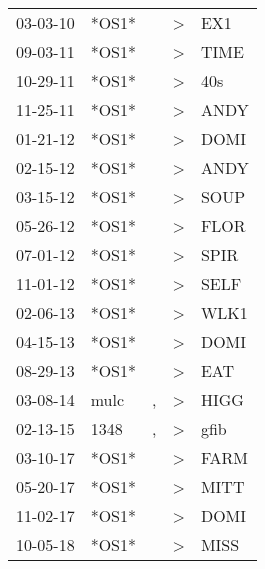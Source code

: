 \begin{supertabular}{lllll}
 03-03-10 &  *OS1* &    &  \textgreater &   EX1 \\
 09-03-11 &  *OS1* &    &  \textgreater &  TIME \\
 10-29-11 &  *OS1* &    &  \textgreater &   40s \\
 11-25-11 &  *OS1* &    &  \textgreater &  ANDY \\
 01-21-12 &  *OS1* &    &  \textgreater &  DOMI \\
 02-15-12 &  *OS1* &    &  \textgreater &  ANDY \\
 03-15-12 &  *OS1* &    &  \textgreater &  SOUP \\
 05-26-12 &  *OS1* &    &  \textgreater &  FLOR \\
 07-01-12 &  *OS1* &    &  \textgreater &  SPIR \\
 11-01-12 &  *OS1* &    &  \textgreater &  SELF \\
 02-06-13 &  *OS1* &    &  \textgreater &  WLK1 \\
 04-15-13 &  *OS1* &    &  \textgreater &  DOMI \\
 08-29-13 &  *OS1* &    &  \textgreater &   EAT \\
 03-08-14 &   mulc &  , &  \textgreater &  HIGG \\
 02-13-15 &   1348 &  , &  \textgreater &  gfib \\
 03-10-17 &  *OS1* &    &  \textgreater &  FARM \\
 05-20-17 &  *OS1* &    &  \textgreater &  MITT \\
 11-02-17 &  *OS1* &    &  \textgreater &  DOMI \\
 10-05-18 &  *OS1* &    &  \textgreater &  MISS \\
\end{supertabular}
